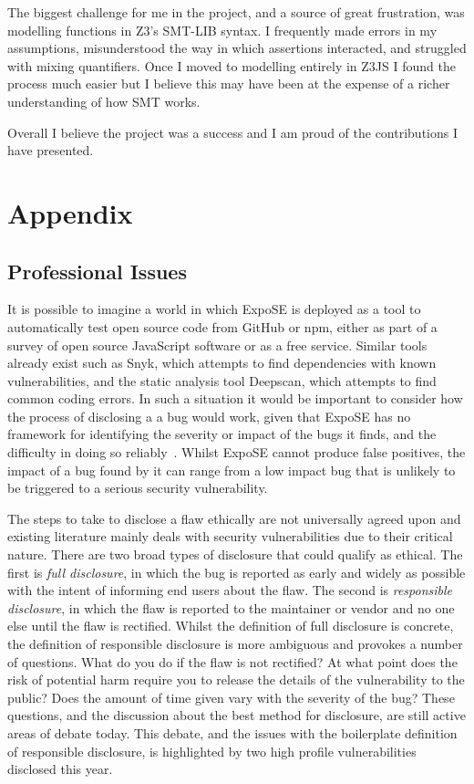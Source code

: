 \documentclass[]{final_report}
\begin{document}
The biggest challenge for me in the project, and a source of great frustration, was modelling functions in Z3's SMT-LIB syntax. I frequently made errors in my assumptions, misunderstood the way in which assertions interacted, and struggled with mixing quantifiers. Once I moved to modelling entirely in Z3JS I found the process much easier but I believe this may have been at the expense of a richer understanding of how SMT works.

Overall I believe the project was a success and I am proud of the contributions I have presented.

\newpage


\label{endpage}

\newpage

\chapter{Appendix}

\section{Professional Issues}
It is possible to imagine a world in which ExpoSE is deployed as a tool to automatically test open source code from GitHub or npm, either as part of a survey of open source JavaScript software or as a free service. Similar tools already exist such as Snyk, which attempts to find dependencies with known vulnerabilities, and the static analysis tool Deepscan, which attempts to find common coding errors. In such a situation it would be important to consider how the process of disclosing a a bug would work, given that ExpoSE has no framework for identifying the severity or impact of the bugs it finds, and the difficulty in doing so reliably~\cite{lamkanfi2010predicting}. Whilst ExpoSE cannot produce false positives, the impact of a bug found by it can range from a low impact bug that is unlikely to be triggered to a serious security vulnerability. 

The steps to take to disclose a flaw ethically are not universally agreed upon and existing literature mainly deals with security vulnerabilities due to their critical nature. There are two broad types of disclosure that could qualify as ethical. The first is \textit{full disclosure}, in which the bug is reported as early and widely as possible with the intent of informing end users about the flaw. The second is \textit{responsible disclosure}, in which the flaw is reported to the maintainer or vendor and no one else until the flaw is rectified. Whilst the definition of full disclosure is concrete, the definition of responsible disclosure is more ambiguous and provokes a number of questions. What do you do if the flaw is not rectified? At what point does the risk of potential harm require you to release the details of the vulnerability to the public? Does the amount of time given vary with the severity of the bug? These questions, and the discussion about the best method for disclosure, are still active areas of debate today. This debate, and the issues with the boilerplate definition of responsible disclosure, is highlighted by two high profile vulnerabilities disclosed this year. 
\end{document}
